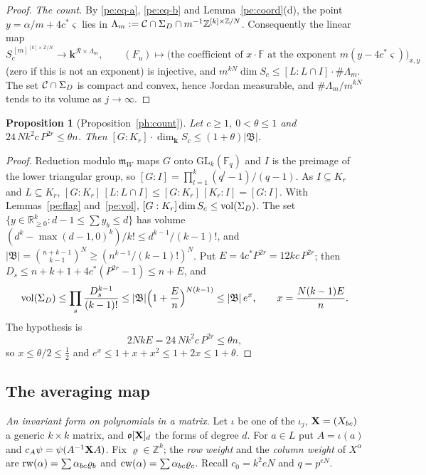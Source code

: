 \documentclass[10pt]{amsart}
\newtheorem{proposition}[theorem]{Proposition}
\theoremstyle{definition}
\theoremstyle{remark}
\newcommand{\R}{\mathbb R}
\newcommand{\Z}{\mathbb Z}
\providecommand{\auF}{\mathbb F}
\providecommand{\auGL}{\mathrm{GL}}
\providecommand{\pam}{\mathfrak m}
\providecommand{\pao}{\mathfrak o}
\providecommand{\phB}{\mathfrak B}
\providecommand{\phk}{\boldsymbol k}
\begin{document}
\begin{proof}
\emph{The count.} By \eqref{pe:eq-a}, \eqref{pe:eq-b} and Lemma~\ref{pe:coord}(d), the point
$y=\alpha/m+4c^*\varsigma$ lies in $\Lambda_m:=\peC\cap\Sigma_D\cap m^{-1}\Z^{[k]\times\Z/N}$.
Consequently the linear map
\[
S_c^{\,[m]^{[k]\times\Z/N}}\to\phk^{\mathcal R\times\Lambda_m},\qquad(F_u)\mapsto\bigl(\text{the
coefficient of }x\cdot\mathbb F\text{ at the exponent }m(y-4c^*\varsigma)\bigr)_{x,y}
\]
(zero if this is not an exponent) is injective, and $m^{kN}\dim S_c\le[L:L\cap I]\cdot\#\Lambda_m$.
The set $\mathcal C\cap\Sigma_D$ is compact and convex, hence Jordan measurable, and
$\#\Lambda_m/m^{kN}$ tends to its volume as $j\to\infty$.
\end{proof}

\begin{proposition}[Proposition~\ref{ph:count}]\label{pe:count}
Let $c\ge1$, $0<\theta\le1$ and $24\,Nk^2c\,P^{2r}\le\theta n$. Then
$[G:K_r]\cdot\dim_{\phk} S_c\le(1+\theta)|\phB|$.
\end{proposition}
\begin{proof}
Reduction modulo $\pam_W$ maps $G$ onto $\auGL_k(\auF_q)$ and $I$ is the preimage of the lower
triangular group, so $[G:I]=\prod_{l=1}^k(q^l-1)/(q-1)$. As $I\subseteq K_r$ and $L\subseteq K_r$,
$[G:K_r]\,[L:L\cap I]\le[G:K_r]\,[K_r:I]=[G:I]$. With Lemmas~\ref{pe:flag} and~\ref{pe:vol},
$[G:K_r]\dim S_c\le\operatorname{vol}(\Sigma_D)$. The set $\{y\in\R_{\ge0}^k:d-1\le\sum y_b\le d\}$ has volume
$(d^k-\max(d-1,0)^k)/k!\le d^{k-1}/(k-1)!$, and $|\phB|=\binom{n+k-1}{k-1}^N\ge(n^{k-1}/(k-1)!)^N$.
Put $E=4c^*P^{2r}=12kc\,P^{2r}$; then $D_s\le n+k+1+4c^*(P^{2r}-1)\le n+E$, and
\[
\pevol(\Sigma_D)\le\prod_s\frac{D_s^{k-1}}{(k-1)!}\le|\phB|\Bigl(1+\frac En\Bigr)^{N(k-1)}\le|\phB|
\,e^{x},\qquad x=\frac{N(k-1)E}{n} .
\]
The hypothesis is
\begin{equation}\label{pe:eq-hyp}
2NkE=24\,Nk^2c\,P^{2r}\le\theta n ,
\end{equation}
so $x\le\theta/2\le\tfrac12$ and $e^x\le1+x+x^2\le1+2x\le1+\theta$.
\end{proof}

\subsection{The averaging map}\label{pe:ss-av}
\emph{An invariant form on polynomials in a matrix.} Let $\iota$ be one of the $\iota_j$, $\mathbf X=
(X_{bc})$ a generic $k\times k$ matrix, and $\pao[\peX]_d$ the forms of degree $d$. For $a\in L$
put $A=\iota(a)$ and $c_A\psi=\psi(A^{-1}\mathbf X A)$. Fix $\varrho\in\Z^k$; the \emph{row weight} and
the \emph{column weight} of $X^\alpha$ are $\operatorname{rw}(\alpha)=\sum\alpha_{bc}\varrho_b$ and
$\operatorname{cw}(\alpha)=\sum\alpha_{bc}\varrho_c$. Recall $c_0=k^2eN$ and $q=p^{eN}$.
\end{document}
